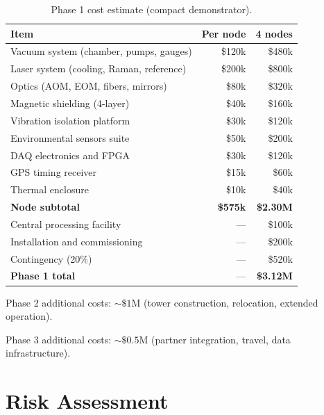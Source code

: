 \documentclass[12pt,a4paper]{article}
\begin{document}
\begin{table}[H]
\centering
\begin{tabular}{lrr}
\toprule
\textbf{Item} & \textbf{Per node} & \textbf{4 nodes} \\
\midrule
Vacuum system (chamber, pumps, gauges) & \$120k & \$480k \\
Laser system (cooling, Raman, reference) & \$200k & \$800k \\
Optics (AOM, EOM, fibers, mirrors) & \$80k & \$320k \\
Magnetic shielding (4-layer) & \$40k & \$160k \\
Vibration isolation platform & \$30k & \$120k \\
Environmental sensors suite & \$50k & \$200k \\
DAQ electronics and FPGA & \$30k & \$120k \\
GPS timing receiver & \$15k & \$60k \\
Thermal enclosure & \$10k & \$40k \\
\midrule
\textbf{Node subtotal} & \textbf{\$575k} & \textbf{\$2.30M} \\
\midrule
Central processing facility & --- & \$100k \\
Installation and commissioning & --- & \$200k \\
Contingency (20\%) & --- & \$520k \\
\midrule
\textbf{Phase 1 total} & --- & \textbf{\$3.12M} \\
\bottomrule
\end{tabular}
\caption{Phase 1 cost estimate (compact demonstrator).}
\label{tab:cost}
\end{table}

Phase 2 additional costs: $\sim\$1$M (tower construction, relocation,
extended operation).

Phase 3 additional costs: $\sim\$0.5$M (partner integration, travel,
data infrastructure).


\section{Risk Assessment}\label{sec:risk}
\end{document}
